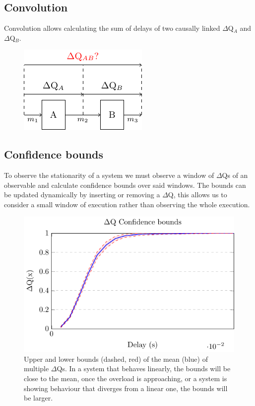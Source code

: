     \subsection{Convolution}
    Convolution allows calculating the sum of delays of two causally linked $\Delta$Q$_A$ and $\Delta$Q$_B$. 
        \begin{figure}[H]
            \begin{center}
                \includegraphics{tikz/comb_dq_comp.pdf}
            \end{center}
        \end{figure}


    \subsection{Confidence bounds}
    To observe the stationarity of a system we must observe a window of $\Delta$Qs of an observable and calculate confidence bounds over said windows. The bounds can be updated dynamically by inserting or removing a $\Delta$Q, this allows us to consider a small window of execution rather than observing the whole execution.
        \begin{figure}[H]
            \begin{center}
                \includegraphics[scale=1]{tikz/ci.pdf} 
            \end{center}
            \caption{Upper and lower bounds (dashed, red) of the mean (blue) of multiple $\Delta$Qs. In a system that behaves linearly, the bounds will be close to the mean, once the overload is approaching, or a system is showing behaviour that diverges from a linear one, the bounds will be larger.}
        \end{figure}

  
